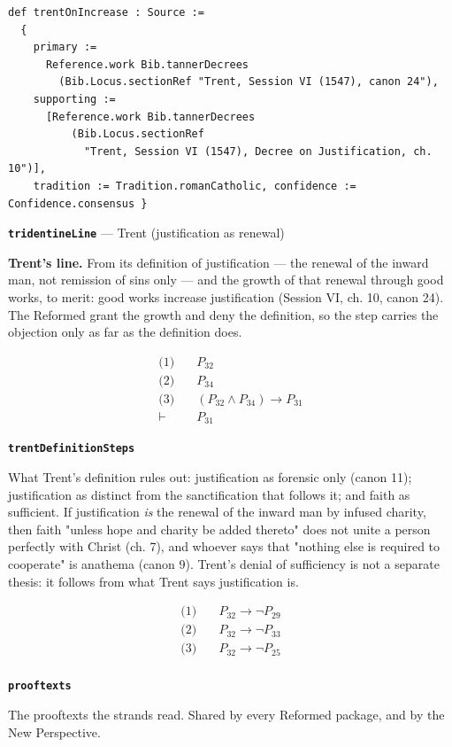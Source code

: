 \documentclass[11pt]{article}
\begin{document}
{\small\begin{verbatim}
def trentOnIncrease : Source :=
  {
    primary :=
      Reference.work Bib.tannerDecrees
        (Bib.Locus.sectionRef "Trent, Session VI (1547), canon 24"),
    supporting :=
      [Reference.work Bib.tannerDecrees
          (Bib.Locus.sectionRef
            "Trent, Session VI (1547), Decree on Justification, ch. 10")],
    tradition := Tradition.romanCatholic, confidence := Confidence.consensus }
\end{verbatim}}
\par\medskip\noindent\textbf{\texttt{tridentine\allowbreak{}Line}} --- Trent (justification as renewal)\par\nobreak\noindent
\textbf{Trent's line.} From its definition of justification — the renewal of the inward man, not remission of sins only — and the growth of that renewal through good works, to merit: good works increase justification (Session VI, ch. 10, canon 24). The Reformed grant the growth and deny the definition, so the step carries the objection only as far as the definition does.

\begin{align*}
  \text{(1)} \quad & P_{32} \\
  \text{(2)} \quad & P_{34} \\
  \text{(3)} \quad & (P_{32} \land P_{34}) \rightarrow P_{31} \\
  \vdash \quad & P_{31}
\end{align*}
\par\medskip\noindent\textbf{\texttt{trent\allowbreak{}Definition\allowbreak{}Steps}}\par\nobreak\noindent
What Trent's definition rules out: justification as forensic only (canon 11); justification as distinct from the sanctification that follows it; and faith as sufficient. If justification \emph{is} the renewal of the inward man by infused charity, then faith "unless hope and charity be added thereto" does not unite a person perfectly with Christ (ch. 7), and whoever says that "nothing else is required to cooperate" is anathema (canon 9). Trent's denial of sufficiency is not a separate thesis: it follows from what Trent says justification is.

\begin{align*}
  \text{(1)} \quad & P_{32} \rightarrow \lnot P_{29} \\
  \text{(2)} \quad & P_{32} \rightarrow \lnot P_{33} \\
  \text{(3)} \quad & P_{32} \rightarrow \lnot P_{25} \\
\end{align*}
\par\medskip\noindent\textbf{\texttt{prooftexts}}\par\nobreak\noindent
The prooftexts the strands read. Shared by every Reformed package, and by the New Perspective.
\end{document}
